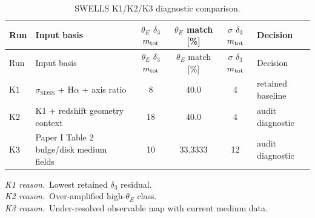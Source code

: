\scriptsize
\begin{longtable}{@{}l p{} c c c l@{}}
\caption{SWELLS K1/K2/K3 diagnostic comparison.}\label{tab:manual-lensing-swells-k123}\\
\toprule
Run & Input basis & $\theta_E$ $\delta_3$ $m_{\rm tot}$ & $\theta_E$ match [\%] & $\sigma$ $\delta_3$ $m_{\rm tot}$ & Decision\\
\midrule
\endfirsthead
\toprule
Run & Input basis & $\theta_E$ $\delta_3$ $m_{\rm tot}$ & $\theta_E$ match [\%] & $\sigma$ $\delta_3$ $m_{\rm tot}$ & Decision\\
\midrule
\endhead
K1 & $\sigma_{\mathrm{SDSS}}$ + H$\alpha$ + axis ratio & 8 & 40.0 & 4 & retained baseline\\
K2 & K1 + redshift geometry context & 18 & 40.0 & 4 & audit diagnostic\\
K3 & Paper I Table 2 bulge/disk medium fields & 10 & 33.3333 & 12 & audit diagnostic\\
\bottomrule
\end{longtable}
\normalsize
\smallskip
\noindent\emph{K1 reason.}\ Lowest retained $\delta_3$ residual.\\
\emph{K2 reason.}\ Over-amplified high-$\theta_E$ class.\\
\emph{K3 reason.}\ Under-resolved observable map with current medium data.
